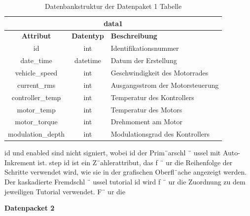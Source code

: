 \begin{table}[H]
	\begin{center}
		\begin{tabular}{|c|c|l|}
			\hline
			\multicolumn{3}{|c|}{\textbf{data1}} \\ \hline
			\textbf{Attribut} & \textbf{Datentyp} & \textbf{Beschreibung}            \\ \hline
			id                & int               & Identifikationsnummer            \\ \hline
			date\_time        & datetime          & Datum der Erstellung             \\ \hline
			vehicle\_speed    & int               & Geschwindigkeit des Motorrades   \\ \hline
			current\_rms      & int               & Ausgangsstrom der Motorsteuerung \\ \hline
			controller\_temp  & int               & Temperatur des Kontrollers       \\ \hline
			motor\_temp       & int               & Temperatur des Motors            \\ \hline
			motor\_torque     & int               & Drehmoment am Motor              \\ \hline
			modulation\_depth & int               & Modulationsgrad des Kontrollers  \\ \hline
		\end{tabular}
			\caption{Datenbankstruktur der Datenpaket 1 Tabelle}
			\label{tab:data1}
	\end{center}
\end{table}

id und enabled sind nicht signiert, wobei id der Prim¨arschl ¨ ussel mit Auto-Inkrement ist.
step id ist ein Z¨ahlerattribut, das f ¨ ur die Reihenfolge der Schritte verwendet wird, wie
sie in der grafischen Oberfl¨ache angezeigt werden. Der kaskadierte Fremdschl ¨ ussel
tutorial id wird f ¨ ur die Zuordnung zu dem jeweiligen Tutorial verwendet. F¨ ur die

\newpage

\textbf{Datenpacket 2}

